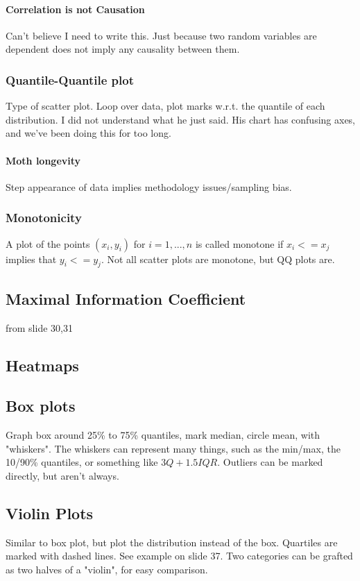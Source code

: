 \documentclass[a4paper]{article}
\begin{document}
\paragraph{Correlation is not Causation}
Can't believe I need to write this. Just because two random variables are dependent does not imply any causality between them.

\subsubsection{Quantile-Quantile plot}
Type of scatter plot. Loop over data, plot marks w.r.t. the quantile of each distribution. I did not understand what he just said. His chart has confusing axes, and we've been doing this for too long.

\paragraph{Moth longevity}
Step appearance of data implies methodology issues/sampling bias.

\subsubsection{Monotonicity}
A plot of the points $(x_i, y_i)$ for $i=1,...,n$ is called monotone if $x_i <= x_j$ implies that $y_i <= y_j$. Not all scatter plots are monotone, but QQ plots are.

\subsection{Maximal Information Coefficient}
from slide 30,31

\subsection{Heatmaps}

\subsection{Box plots}
Graph box around 25\% to 75\% quantiles, mark median, circle mean, with "whiskers". The whiskers can represent many things, such as the min/max, the 10/90\% quantiles, or something like $3Q + 1.5IQR$. Outliers can be marked directly, but aren't always.

\subsection{Violin Plots}
Similar to box plot, but plot the distribution instead of the box. Quartiles are marked with dashed lines. See example on slide 37. Two categories can be grafted as two halves of a "violin", for easy comparison.
\end{document}
